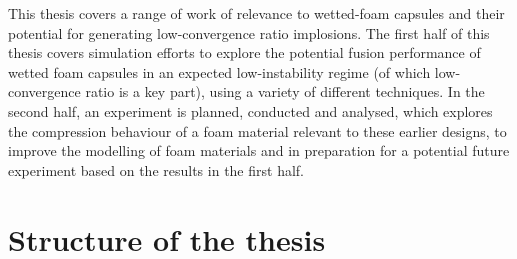 
This thesis covers a range of work of relevance to wetted-foam capsules and their potential for generating low-convergence ratio implosions. The first half of this thesis covers simulation efforts to explore the potential fusion performance of wetted foam capsules in an expected low-instability regime (of which low-convergence ratio is a key part), using a variety of different techniques. In the second half, an experiment is planned, conducted and analysed, which explores the compression behaviour of a foam material relevant to these earlier designs, to improve the modelling of foam materials and in preparation for a potential future experiment based on the results in the first half.


\section{Structure of the thesis}

